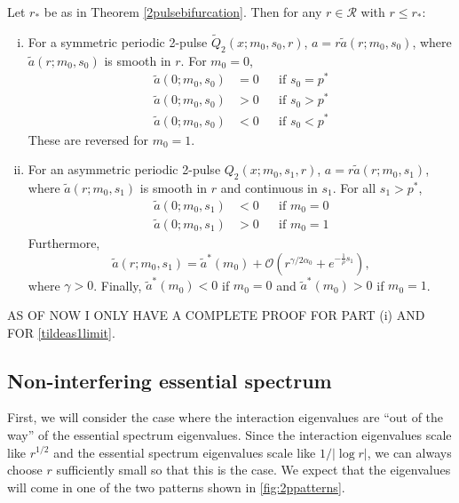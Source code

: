 \documentclass[thesis.tex]{subfiles}
\begin{document}
\begin{lemma}\label{lemma:chara}
Let $r_*$ be as in Theorem \ref{2pulsebifurcation}. Then for any $r \in \mathcal{R}$ with $r \leq r_*$:
\begin{enumerate}[(i)]
	\item For a symmetric periodic 2-pulse $\tilde{Q}_2(x; m_0, s_0, r)$, $a = r \tilde{a}(r; m_0, s_0)$, where $\tilde{a}(r; m_0, s_0)$ is smooth in $r$. For $m_0 = 0$,
	\begin{equation}
	\begin{aligned}
	\tilde{a}(0; m_0, s_0) &= 0 && \text{if }s_0 = p^* \\
	\tilde{a}(0; m_0, s_0) &> 0 && \text{if }s_0 > p^* \\
	\tilde{a}(0; m_0, s_0) &< 0 && \text{if }s_0 < p^*
	\end{aligned}
	\end{equation}
	These are reversed for $m_0 = 1$.
	\item For an asymmetric periodic 2-pulse $Q_2(x; m_0, s_1, r)$, $a = r \tilde{a}(r; m_0, s_1)$, where $\tilde{a}(r; m_0, s_1)$ is smooth in $r$ and continuous in $s_1$. For all $s_1 > p^*$,
	\begin{equation}
	\begin{aligned}
	\tilde{a}(0; m_0, s_1) &< 0 && \text{if }m_0 = 0 \\
	\tilde{a}(0; m_0, s_1) &> 0 && \text{if }m_0 = 1
	\end{aligned}
	\end{equation}
	Furthermore,
	\begin{equation}\label{tildeas1limit}
	\tilde{a}(r; m_0, s_1) = \tilde{a}^*(m_0) + \mathcal{O}\left(r^{\gamma/2\alpha_0} + e^{-\frac{1}{\rho}s_1} \right),
	\end{equation}
	where $\gamma > 0$. Finally, $\tilde{a}^*(m_0) < 0$ if $m_0 = 0$ and $\tilde{a}^*(m_0) > 0$ if $m_0 = 1$.
\end{enumerate}	
\end{lemma}
AS OF NOW I ONLY HAVE A COMPLETE PROOF FOR PART (i) AND FOR \cref{tildeas1limit}.

\subsection{Non-interfering essential spectrum }

First, we will consider the case where the interaction eigenvalues are ``out of the way'' of the essential spectrum eigenvalues. Since the interaction eigenvalues scale like $r^{1/2}$ and the essential spectrum eigenvalues scale like $1/|\log r|$, we can always choose $r$ sufficiently small so that this is the case. We expect that the eigenvalues will come in one of the two patterns shown in \cref{fig:2ppatterns}.
\end{document}
